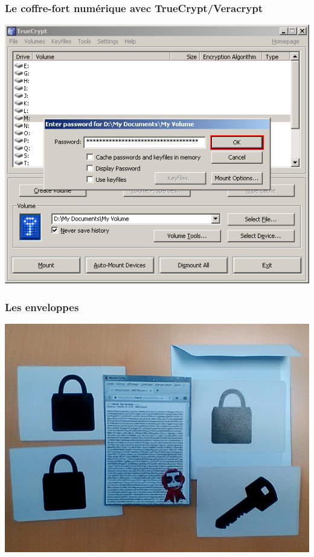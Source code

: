 \documentclass{beamer}
\begin{document}
\begin{frame}
\frametitle{ Le coffre-fort numérique avec TrueCrypt/Veracrypt}

\begin{center}
\includegraphics[scale=0.4] {./images/Truecrypt18.png}
\end{center}
\end{frame}

\begin{frame}
\frametitle{Les enveloppes}

\begin{center}
\includegraphics[scale=0.4] {./images/gpg.jpg}
\end{center}
\end{frame}
\end{document}
